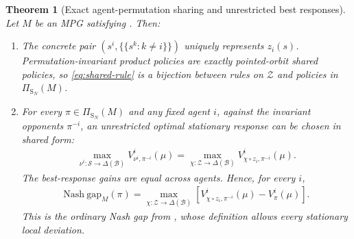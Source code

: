 \documentclass{article}
\theoremstyle{plain}
\newtheorem{theorem}{Theorem}
\theoremstyle{definition}
\theoremstyle{remark}
\newcommand{\Nash}{\mathrm{Nash\ gap}}
\newcommand{\St}{\mathcal{S}}
\newcommand{\Sym}{\mathrm{S}}
\begin{document}
\begin{theorem}[Exact agent-permutation sharing and unrestricted best responses]
\label{thm:exact-permutation-sharing}
Let $M$ be an MPG satisfying
. Then:
\begin{enumerate}[label=\arabic*.,leftmargin=2.0em,itemsep=2pt,topsep=2pt]
  \item The concrete pair
  $(s^i,\{\!\{s^k:k\ne i\}\!\})$ uniquely represents $z_i(s)$.
  Permutation-invariant product policies are exactly pointed-orbit shared
  policies, so \eqref{eq:shared-rule} is a bijection between rules on
  $\mathcal Z$ and policies in $\Pi_{\Sym_N}(M)$.

  \item For every $\pi\in\Pi_{\Sym_N}(M)$ and any fixed agent $i$, against the
  invariant opponents $\pi^{-i}$, an
  unrestricted optimal stationary response can be chosen in shared form:
  \begin{align}
    \max_{\nu^i:\St\to\Delta(\mathcal B)}
    V^i_{\nu^i,\pi^{-i}}(\mu)
    =
    \max_{\chi:\mathcal Z\to\Delta(\mathcal B)}
    V^i_{\chi\circ z_i,\pi^{-i}}(\mu).
    \label{eq:perm-best-response-reduction}
  \end{align}
  The best-response gains are equal across agents. Hence, for every $i$,
  \begin{align}
    \Nash_M(\pi)
    =
    \max_{\chi:\mathcal Z\to\Delta(\mathcal B)}
    \left[
      V^i_{\chi\circ z_i,\pi^{-i}}(\mu)
      -
      V^i_\pi(\mu)
    \right].
    \label{eq:perm-nash-reduction}
  \end{align}
  This is the ordinary Nash gap from , whose definition allows
  every stationary local deviation.


\end{enumerate}
\end{theorem}
\end{document}
